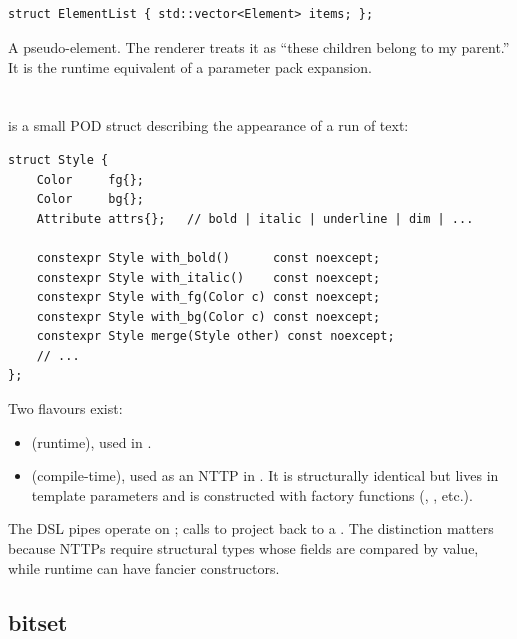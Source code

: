 \subsection{}

\begin{lstlisting}
struct ElementList { std::vector<Element> items; };
\end{lstlisting}

A pseudo-element. The renderer treats it as ``these children belong
to my parent.'' It is the runtime equivalent of a parameter pack
expansion.

\section{}

 is a small POD struct describing the appearance of a run
of text:

\begin{lstlisting}
struct Style {
    Color     fg{};
    Color     bg{};
    Attribute attrs{};   // bold | italic | underline | dim | ...

    constexpr Style with_bold()      const noexcept;
    constexpr Style with_italic()    const noexcept;
    constexpr Style with_fg(Color c) const noexcept;
    constexpr Style with_bg(Color c) const noexcept;
    constexpr Style merge(Style other) const noexcept;
    // ...
};
\end{lstlisting}

Two flavours exist:

\begin{itemize}[leftmargin=*]
  \item {} (runtime), used in .
  \item {} (compile-time), used as an NTTP in
    . It is structurally identical but lives in
    template parameters and is constructed with 
    factory functions (,
    , etc.).
\end{itemize}

The DSL pipes operate on ;  calls
 to project back to a . The
distinction matters because NTTPs require structural types whose
fields are compared by value, while runtime  can have
fancier constructors.

\subsection{ bitset}

